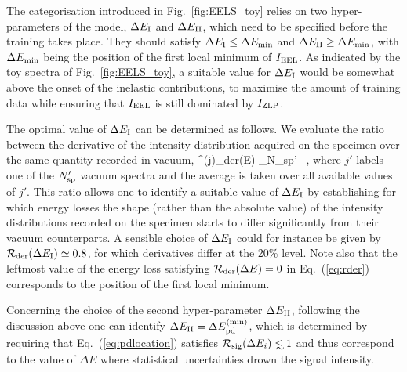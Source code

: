The categorisation introduced in Fig.~\ref{fig:EELS_toy} relies on
two hyper-parameters of the model, $\Delta E_{\rm I}$ and
$\Delta E_{\rm II}$, which need to be specified before the training takes place.
%
They should satisfy $\Delta E_{\rm I} \le \Delta E_{\rm min}$ and $\Delta E_{\rm II} \ge \Delta E_{\rm min}$,
with $\Delta E_{\rm min}$ being the position of the first local minimum of $I_{\rm EEL}$.
%
As indicated by the toy spectra of Fig.~\ref{fig:EELS_toy}, a suitable value for $\Delta E_{\rm I}$
would be somewhat above the onset of the inelastic contributions, to maximise
the amount of training data while ensuring that $I_{\rm EEL}$ is still dominated
by $I_{\rm ZLP}$.

The optimal value of $\Delta E_{\rm I}$  can be determined as follows.
%
We evaluate the ratio
between the derivative of the intensity distribution acquired on the specimen over the
same quantity recorded in vacuum,
\be
\label{eq:rder}
^{(j)}_{\rm der}(\Delta E) \equiv
\la
{} \ra_{N_{\rm sp}' } \, ,
\ee
where $j'$ labels one of the $N_{\rm sp}'$ vacuum spectra and the average is taken
over all available values of $j'$.
%
This ratio allows one to identify a suitable value of $\Delta E_{\rm I}$ by establishing
for which energy losses the shape (rather than the absolute value) of the intensity distributions 
recorded on the specimen starts to differ significantly from their vacuum counterparts.
%
A sensible choice of $\Delta E_{\rm I}$ could for instance be given by
$\mathcal{R}_{\rm der}(\Delta E_{\rm I}) \simeq 0.8$, for which derivatives differ
at the 20\% level.
%
Note also that the leftmost value of the energy loss satisfying
$\mathcal{R}_{\rm der}(\Delta E)=0$ in Eq.~(\ref{eq:rder}) corresponds to the position of the first
local minimum.

Concerning the choice of the second hyper-parameter $\Delta E_{\rm II}$, following the discussion
above one can identify $\Delta E_{\rm II}=\Delta E_{\rm pd}^{\rm (min)}$, which is determined by requiring  that
Eq.~(\ref{eq:pdlocation}) satisfies $\mathcal{R}_{\rm sig}(\Delta E_i)\lsim 1$ and thus correspond
to the value of $\Delta E$ where statistical uncertainties drown the signal intensity.
